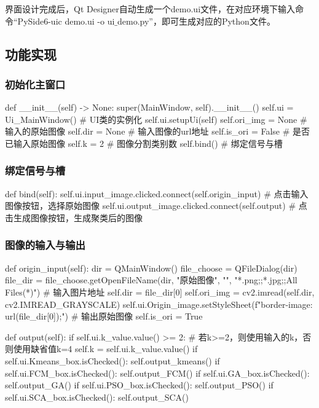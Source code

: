 \documentclass{article}
\begin{document}
界面设计完成后，Qt Designer自动生成一个demo.ui文件，在对应环境下输入命令“PySide6-uic demo.ui -o ui$\_$demo.py”，即可生成对应的Python文件。	

\subsection{功能实现}
\subsubsection{初始化主窗口}
\begin{python}
	def __init__(self) -> None:
	super(MainWindow, self).__init__()
	self.ui = Ui_MainWindow() # UI类的实例化
	self.ui.setupUi(self)
	self.ori_img = None # 输入的原始图像
	self.dir = None # 输入图像的url地址
	self.is_ori = False # 是否已输入原始图像
	self.k = 2 # 图像分割类别数
	self.bind() # 绑定信号与槽
\end{python}

\subsubsection{绑定信号与槽}
\begin{python}
	def bind(self):
	self.ui.input_image.clicked.connect(self.origin_input) # 点击输入图像按钮，选择原始图像
	self.ui.output_image.clicked.connect(self.output) # 点击生成图像按钮，生成聚类后的图像
\end{python}

\subsubsection{图像的输入与输出}
\begin{python}
	def origin_input(self):
	dir = QMainWindow()
	file_choose = QFileDialog(dir)
	file_dir = file_choose.getOpenFileName(dir, "原始图像", "", "*.png;;*.jpg;;All Files(*)") # 输入图片地址
	self.dir = file_dir[0]
	self.ori_img = cv2.imread(self.dir, cv2.IMREAD_GRAYSCALE)
	self.ui.Origin_image.setStyleSheet(f"border-image: url({file_dir[0]});") # 输出原始图像
	self.is_ori = True
	
	def output(self):
	if self.ui.k_value.value() >= 2: # 若k>=2，则使用输入的k，否则使用缺省值k=4
	self.k = self.ui.k_value.value()
	if self.ui.Kmeans_box.isChecked():
	self.output_kmeans()
	if self.ui.FCM_box.isChecked():
	self.output_FCM()
	if self.ui.GA_box.isChecked():
	self.output_GA()
	if self.ui.PSO_box.isChecked():
	self.output_PSO()
	if self.ui.SCA_box.isChecked():
	self.output_SCA()
\end{python}
\end{document}
